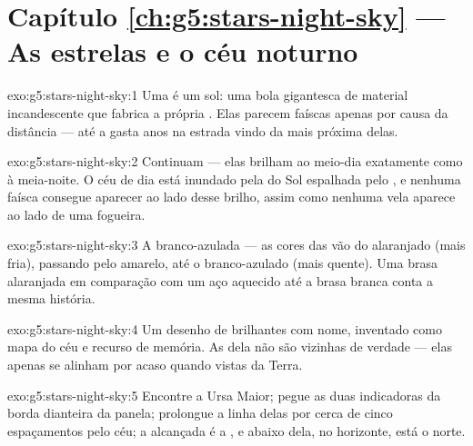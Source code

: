 \section*{Capítulo \ref{ch:g5:stars-night-sky} --- As estrelas e o céu noturno}

\begin{solution}{exo:g5:stars-night-sky:1}
Uma  é um sol: uma bola gigantesca de material incandescente
que fabrica a própria . Elas parecem faíscas apenas por causa da
distância --- até a  gasta anos na estrada vindo da mais próxima
delas.
\end{solution}

\begin{solution}{exo:g5:stars-night-sky:2}
Continuam --- elas brilham ao meio-dia exatamente como à meia-noite.
O céu de dia está inundado pela  do Sol espalhada pelo , e
nenhuma faísca consegue aparecer ao lado desse brilho, assim como
nenhuma vela aparece ao lado de uma fogueira.
\end{solution}

\begin{solution}{exo:g5:stars-night-sky:3}
A branco-azulada --- as cores das  vão do alaranjado (mais
fria), passando pelo amarelo, até o branco-azulado (mais quente). Uma
brasa alaranjada em comparação com um aço aquecido até a brasa branca
conta a mesma história.
\end{solution}

\begin{solution}{exo:g5:stars-night-sky:4}
Um desenho de  brilhantes com nome, inventado como mapa do
céu e recurso de memória. As  dela não são vizinhas de
verdade --- elas apenas se alinham por acaso quando vistas da Terra.
\end{solution}

\begin{solution}{exo:g5:stars-night-sky:5}
Encontre a Ursa Maior; pegue as duas  indicadoras da borda
dianteira da panela; prolongue a linha delas por cerca de cinco
espaçamentos pelo céu; a  alcançada é a , e
abaixo dela, no horizonte, está o norte.
\end{solution}

